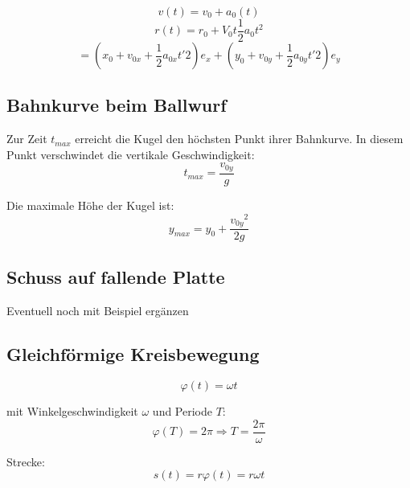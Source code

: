 \documentclass[7pt]{article}
\begin{document}
\begin{multicols*}{3}
\begin{equation*}
	v(t) = v_0 + a_0(t)
\end{equation*}
\begin{equation*}
r(t) = r_0 + V_0t \frac{1}{2}a_0t^2 
\end{equation*}
\begin{equation*}
	= \left(x_0 + v_{0x} + \frac{1}{2}a_{0x}t'2\right)e_x + \left(y_0 + v_{0y} + \frac{1}{2}a_{0y}t'2\right)e_y
\end{equation*}
\newline

\subsection{Bahnkurve beim Ballwurf}

Zur Zeit $t_{max}$ erreicht die Kugel den h{\"o}chsten Punkt ihrer Bahnkurve. In diesem Punkt verschwindet die vertikale Geschwindigkeit:
\begin{equation*}
	t_{max} = \frac{v_{0y}}{g}
\end{equation*}
\columnbreak
\newline

Die maximale H{\"o}he der Kugel ist:
\begin{equation*}
	y_{max} = y_0 + \frac{{v_{0y}}^2}{2g}
\end{equation*}



\subsection{Schuss auf fallende Platte}
Eventuell noch mit Beispiel ergänzen


\subsection{Gleichf{\"o}rmige Kreisbewegung}

\begin{equation*}
	\varphi(t) = \omega t
\end{equation*}

mit Winkelgeschwindigkeit $\omega$ und Periode $T$:
\begin{equation*}
	\varphi(T) = 2 \pi \Rightarrow T = \frac{2 \pi}{\omega}
\end{equation*}

Strecke:\newline
\begin{equation*}
	s(t) = r\varphi(t) = r \omega t 
\end{equation*}


\end{multicols*}
\end{document}
